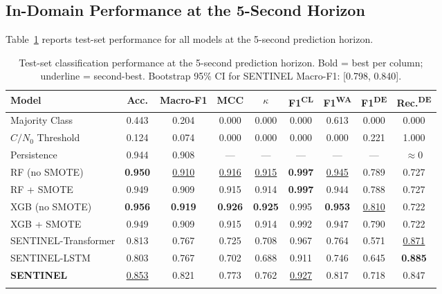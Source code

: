 \documentclass[pdflatex,sn-mathphys-num]{sn-jnl}
\begin{document}
\subsection{In-Domain Performance at the 5-Second Horizon}

Table~\ref{tab:main_results} reports test-set performance for all models
at the 5-second prediction horizon.

\begin{table}[t]
\caption{%
  Test-set classification performance at the 5-second prediction horizon.
  Bold = best per column; underline = second-best.
  Bootstrap 95\% CI for SENTINEL Macro-F1: [0.798, 0.840].}
\label{tab:main_results}
\begin{tabular*}{\textwidth}{@{\extracolsep\fill}lcccccccc@{}}
\toprule
Model & Acc. & Macro-F1 & MCC & $\kappa$ &
  F1\textsuperscript{CL} & F1\textsuperscript{WA} & F1\textsuperscript{DE} &
  Rec.\textsuperscript{DE} \\
\midrule
Majority Class        & 0.443 & 0.204 & 0.000 & 0.000 & 0.000 & 0.613 & 0.000 & 0.000 \\
$C/N_0$ Threshold     & 0.124 & 0.074 & 0.000 & 0.000 & 0.000 & 0.000 & 0.221 & 1.000 \\
Persistence           & 0.944 & 0.908 & ---   & ---   & ---   & ---   & ---   & $\approx$0 \\
RF (no SMOTE)         & \textbf{0.950} & \underline{0.910} & \underline{0.916} &
  \underline{0.915} & \textbf{0.997} & \underline{0.945} & 0.789 & 0.727 \\
RF + SMOTE            & 0.949 & 0.909 & 0.915 & 0.914 & \textbf{0.997} & 0.944 & 0.788 & 0.727 \\
XGB (no SMOTE)        & \textbf{0.956} & \textbf{0.919} & \textbf{0.926} &
  \textbf{0.925} & 0.995 & \textbf{0.953} & \underline{0.810} & 0.722 \\
XGB + SMOTE           & 0.949 & 0.909 & 0.915 & 0.914 & 0.992 & 0.947 & 0.790 & 0.722 \\
SENTINEL-Transformer  & 0.813 & 0.767 & 0.725 & 0.708 & 0.967 & 0.764 & 0.571 & \underline{0.871} \\
SENTINEL-LSTM         & 0.803 & 0.767 & 0.702 & 0.688 & 0.911 & 0.746 & 0.645 & \textbf{0.885} \\
\textbf{SENTINEL}     & \underline{0.853} & 0.821 & 0.773 & 0.762 &
  \underline{0.927} & 0.817 & 0.718 & 0.847 \\
\botrule
\end{tabular*}
\end{table}
\end{document}

